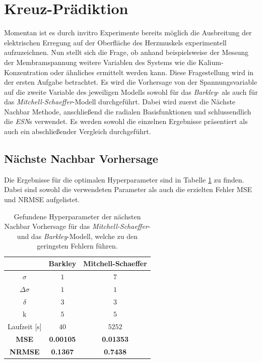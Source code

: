 \section{Kreuz-Prädiktion}
\label{sec:exp_cross_pred}
Momentan ist es durch invitro Experimente bereits möglich die Ausbreitung der elektrischen Erregung auf der Oberfläche des Herzmuskels experimentell aufzuzeichnen. Nun stellt sich die Frage, ob anhand beispielsweise der Messung der Membramspannung weitere Variablen des Systems wie die Kalium-Konzentration oder ähnliches ermittelt werden kann. Diese Fragestellung wird in der ersten Aufgabe betrachtet. Es wird die Vorhersage von der Spannungsvariable auf die zweite Variable des jeweiligen Modells sowohl für das \textit{Barkley}- als auch für das \textit{Mitchell-Schaeffer}-Modell durchgeführt. Dabei wird zuerst die Nächste Nachbar Methode, anschließend die radialen Basisfunktionen und schlussendlich die \textit{ESN}s verwendet. Es werden sowohl die einzelnen Ergebnisse präsentiert als auch ein abschließender Vergleich durchgeführt.
 
\subsection{Nächste Nachbar Vorhersage}
Die Ergebnisse für die optimalen Hyperparameter sind in Tabelle \ref{tab:exp_cross_nn_results} zu finden. Dabei sind sowohl die verwendeten Parameter als auch die erzielten Fehler MSE und NRMSE aufgelistet.
\begin{table}[h]
	\centering

	\begin{tabular}{|c|c|c|}
		\multicolumn{1}{c|}{} & Barkley & Mitchell-Schaeffer \\ 
		\hline \hline 
		\rule[-1ex]{0pt}{2.5ex} $\sigma$ & $1$ & $7$ \\ 
		\hline 
		\rule[-1ex]{0pt}{2.5ex} $\Delta \sigma$ & $1$ & $1$ \\ 
		\hline 
		\rule[-1ex]{0pt}{2.5ex} $\delta$ & $3$ & $3$ \\ 
		\hline 
		\rule[-1ex]{0pt}{2.5ex} k & $5$ & $5$ \\ 
		\hline 
		\rule[-1ex]{0pt}{2.5ex} Laufzeit [s] & $40$ & $5252$ \\ 
		\hline 
		\rule[-1ex]{0pt}{2.5ex} \textbf{MSE} & \textbf{0.00105} & \textbf{0.01353} \\ 
		\hline 
		\rule[-1ex]{0pt}{2.5ex} \textbf{NRMSE} & \textbf{0.1367} & \textbf{0.7438} \\ 
		\hline 
	\end{tabular} 

	\caption{Gefundene Hyperparameter der nächsten Nachbar Vorhersage für das \textit{Mitchell-Schaeffer}- und das \textit{Barkley}-Modell, welche zu den geringsten Fehlern führen.}
\label{tab:exp_cross_nn_results}
\end{table} 

